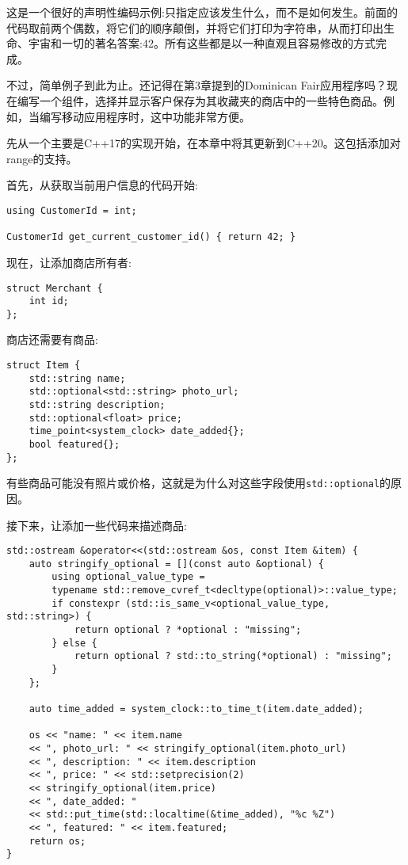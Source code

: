这是一个很好的声明性编码示例:只指定应该发生什么，而不是如何发生。前面的代码取前两个偶数，将它们的顺序颠倒，并将它们打印为字符串，从而打印出生命、宇宙和一切的著名答案:42。所有这些都是以一种直观且容易修改的方式完成。


不过，简单例子到此为止。还记得在第3章提到的Dominican Fair应用程序吗？现在编写一个组件，选择并显示客户保存为其收藏夹的商店中的一些特色商品。例如，当编写移动应用程序时，这中功能非常方便。

先从一个主要是C++17的实现开始，在本章中将其更新到C++20。这包括添加对range的支持。

首先，从获取当前用户信息的代码开始:

\begin{lstlisting}[style=styleCXX]
using CustomerId = int;

CustomerId get_current_customer_id() { return 42; }
\end{lstlisting}

现在，让添加商店所有者:

\begin{lstlisting}[style=styleCXX]
struct Merchant {
	int id;
};
\end{lstlisting}

商店还需要有商品:

\begin{lstlisting}[style=styleCXX]
struct Item {
	std::string name;
	std::optional<std::string> photo_url;
	std::string description;
	std::optional<float> price;
	time_point<system_clock> date_added{};
	bool featured{};
};
\end{lstlisting}

有些商品可能没有照片或价格，这就是为什么对这些字段使用\texttt{std::optional}的原因。

接下来，让添加一些代码来描述商品:

\begin{lstlisting}[style=styleCXX]
std::ostream &operator<<(std::ostream &os, const Item &item) {
	auto stringify_optional = [](const auto &optional) {
		using optional_value_type =
		typename std::remove_cvref_t<decltype(optional)>::value_type;
		if constexpr (std::is_same_v<optional_value_type, std::string>) {
			return optional ? *optional : "missing";
		} else {
			return optional ? std::to_string(*optional) : "missing";
		}
	};

	auto time_added = system_clock::to_time_t(item.date_added);
	
	os << "name: " << item.name
	<< ", photo_url: " << stringify_optional(item.photo_url)
	<< ", description: " << item.description
	<< ", price: " << std::setprecision(2)
	<< stringify_optional(item.price)
	<< ", date_added: "
	<< std::put_time(std::localtime(&time_added), "%c %Z")
	<< ", featured: " << item.featured;
	return os;
}
\end{lstlisting}

